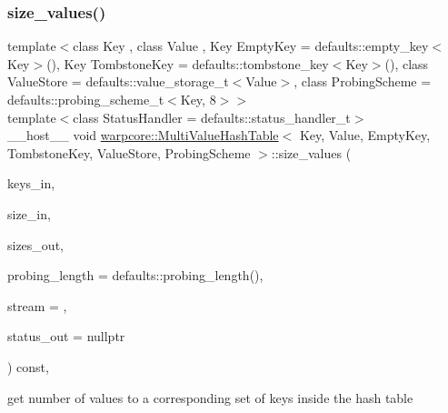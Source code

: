 \subsubsection{\texorpdfstring{size\+\_\+values()}{size\_values()}\hspace{0.1cm}{\footnotesize\ttfamily [2/3]}}
{\footnotesize\ttfamily template$<$class Key , class Value , Key Empty\+Key = defaults\+::empty\+\_\+key$<$\+Key$>$(), Key Tombstone\+Key = defaults\+::tombstone\+\_\+key$<$\+Key$>$(), class Value\+Store  = defaults\+::value\+\_\+storage\+\_\+t$<$\+Value$>$, class Probing\+Scheme  = defaults\+::probing\+\_\+scheme\+\_\+t$<$\+Key, 8$>$$>$ \\
template$<$class Status\+Handler  = defaults\+::status\+\_\+handler\+\_\+t$>$ \\
\+\_\+\+\_\+host\+\_\+\+\_\+ void \hyperlink{classwarpcore_1_1MultiValueHashTable}{warpcore\+::\+Multi\+Value\+Hash\+Table}$<$ Key, Value, Empty\+Key, Tombstone\+Key, Value\+Store, Probing\+Scheme $>$\+::size\+\_\+values (\begin{DoxyParamCaption}\item[{key\+\_\+type $\ast$}]{keys\+\_\+in,  }\item[{index\+\_\+type}]{size\+\_\+in,  }\item[{index\+\_\+type $\ast$}]{sizes\+\_\+out,  }\item[{index\+\_\+type}]{probing\+\_\+length = {\ttfamily defaults\+:\+:probing\+\_\+length()},  }\item[{cuda\+Stream\+\_\+t}]{stream = {},  }\item[{typename Status\+Handler\+::base\+\_\+type $\ast$}]{status\+\_\+out = {\ttfamily nullptr} }\end{DoxyParamCaption}) const\hspace{0.3cm}{\ttfamily [inline]}, {\ttfamily [noexcept]}}



get number of values to a corresponding set of keys inside the hash table 


